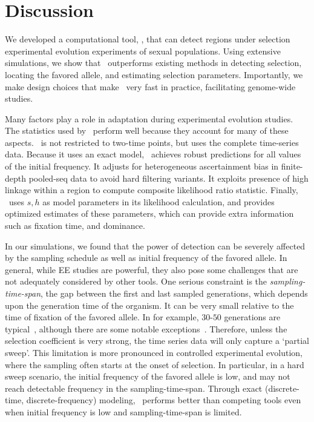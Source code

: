\section{Discussion}
We developed a computational tool, \comale, that can detect regions
under selection experimental evolution experiments of sexual
populations. Using extensive simulations, we show that \comale\
outperforms existing methods in detecting selection, locating the
favored allele, and estimating selection parameters. Importantly, we
make design choices that make \comale\ very fast in practice,
facilitating genome-wide studies.


Many factors play a role in adaptation during experimental evolution
studies. The statistics used by \comale\ perform well because they
account for many of these aspects. \comale\ is not restricted to
two-time points, but uses the complete time-series data. Because it
uses an exact model, \comale\ achieves robust predictions for all
values of the initial frequency. It adjusts for heterogeneous
ascertainment bias in finite-depth pooled-seq data to avoid hard
filtering variants. It exploits presence of high linkage within a
region to compute composite likelihood ratio statistic. Finally,
\comale\ uses $s,h$ as model parameters in its likelihood calculation,
and provides optimized estimates of these parameters, which can
provide extra information such as fixation time, and dominance.

In our simulations, we found that the power of detection can be
severely affected by the sampling schedule as well as initial
frequency of the favored allele.  In general, while EE studies are
powerful, they also pose some challenges that are not adequately
considered by other tools. One serious constraint is the
\emph{sampling-time-span}, the gap between the first and last sampled
generations, which depends upon the generation time of the
organism. It can be very small relative to the time of fixation of the
favored allele. In \dmel for example, $30$-$50$ generations are
typical~\cite{kofler2013guide}, although there are some notable
exceptions~\cite{zhou2011experimental}.  Therefore, unless the
selection coefficient is very strong, the time series data will only
capture a `partial sweep'. This limitation is more pronounced in
controlled experimental evolution, where the sampling often starts at
the onset of selection. In particular, in a hard sweep scenario, the
initial frequency of the favored allele is low, and may not reach
detectable frequency in the sampling-time-span. Through exact
(discrete-time, discrete-frequency) modeling, \comale\ performs better
than competing tools even when initial frequency is low and
sampling-time-span is limited.


